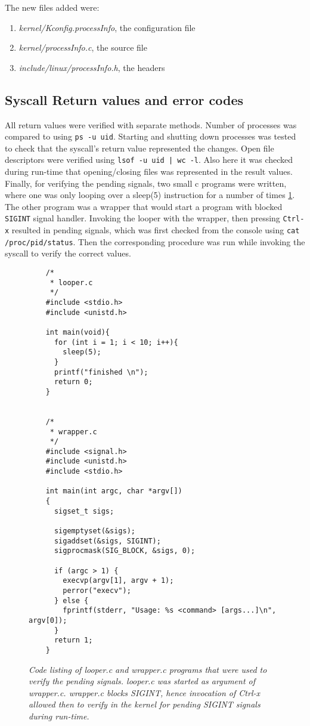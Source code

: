 \documentclass[a4paper,11pt,twoside]{article}
\begin{document}
The new files added were:
\begin{enumerate}
  \item \textit{kernel/Kconfig.processInfo}, the configuration file
  \item \textit{kernel/processInfo.c}, the source file
  \item \textit{include/linux/processInfo.h}, the headers
\end{enumerate}

\subsection{Syscall Return values and error codes}
All return values were verified with separate methods. Number of processes was
compared to using \verb+ps -u uid+. Starting and shutting down processes was
tested to check that the syscall's return value represented the changes.
Open file descriptors were verified using \verb+lsof -u uid | wc -l+. Also here
it was checked during run-time that opening/closing files was represented in the
result values.
Finally, for verifying the pending signals, two small c programs were written,
where one was only looping over a sleep(5) instruction for a number of times
\ref{fig:sigpending}.
The other program was a wrapper that would start a program with blocked
\verb+SIGINT+ signal handler. Invoking the looper with the wrapper, then
pressing \verb+Ctrl-x+ resulted in pending signals, which was first checked from
the console using \verb+cat /proc/pid/status+. Then the corresponding procedure
was run while invoking the syscall to verify the correct values.

\begin{figure}
  \label{fig:sigpending}
  \centering
  \begin{verbatim}
    /*
     * looper.c
     */
    #include <stdio.h>
    #include <unistd.h>

    int main(void){
      for (int i = 1; i < 10; i++){
        sleep(5);
      }
      printf("finished \n");
      return 0;
    }


    /*
     * wrapper.c
     */
    #include <signal.h>
    #include <unistd.h>
    #include <stdio.h>

    int main(int argc, char *argv[])
    {
      sigset_t sigs;

      sigemptyset(&sigs);
      sigaddset(&sigs, SIGINT);
      sigprocmask(SIG_BLOCK, &sigs, 0);

      if (argc > 1) {
        execvp(argv[1], argv + 1);
        perror("execv");
      } else {
        fprintf(stderr, "Usage: %s <command> [args...]\n", argv[0]);
      }
      return 1;
    }
  \end{verbatim}
  \caption{\textit{Code listing of looper.c and wrapper.c programs that were used
  to verify the pending signals. looper.c was started as argument of wrapper.c.
  wrapper.c blocks SIGINT, hence invocation of Ctrl-x allowed then to verify
  in the kernel for pending SIGINT signals during run-time.}}

\end{figure}
\end{document}
